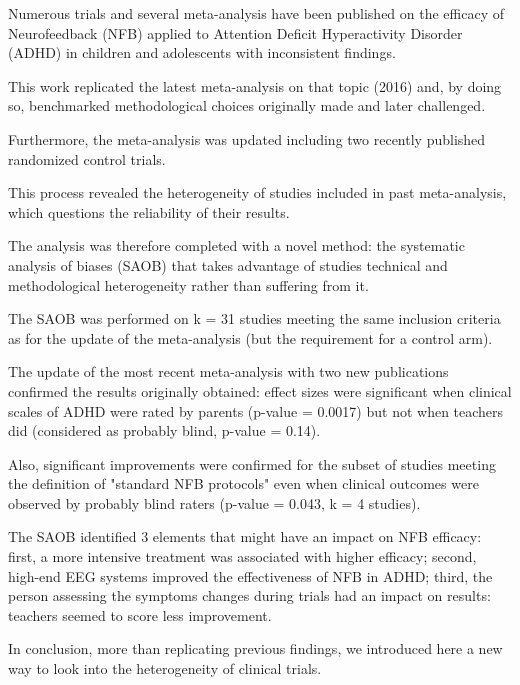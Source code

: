 

\noindent Numerous trials and several meta-analysis have been published on the efficacy of Neurofeedback (NFB) applied
to Attention Deficit Hyperactivity Disorder (ADHD) in children and adolescents with inconsistent findings.

This work replicated the latest meta-analysis on that topic (2016) and, by doing so, benchmarked methodological choices
originally made and later challenged.

Furthermore, the meta-analysis was updated including two recently published randomized control trials.

This process revealed the heterogeneity of studies included in past meta-analysis, which questions the reliability of
their results.

The analysis was therefore completed with a novel method: the systematic analysis of biases (SAOB) that takes advantage
of studies technical and methodological heterogeneity rather than suffering from it.

The SAOB was performed on k = 31 studies meeting the same inclusion criteria as for the update of the meta-analysis (but the requirement for a control arm).

The update of the most recent meta-analysis with two new publications confirmed the results originally obtained: effect
sizes were significant when clinical scales of ADHD were rated by parents (p-value = 0.0017) but not when teachers did
(considered as probably blind, p-value = 0.14).

Also, significant improvements were confirmed for the subset of studies meeting the definition of "standard NFB
protocols" even when clinical outcomes were observed by probably blind raters (p-value = 0.043, k = 4 studies).

The SAOB identified 3 elements that might have an impact on NFB efficacy: first, a more intensive treatment was
associated with higher efficacy; second, high-end EEG systems improved the effectiveness of NFB in ADHD; third, the
person assessing the symptoms changes during trials had an impact on results: teachers seemed to score less improvement.

In conclusion, more than replicating previous findings, we introduced here a new way to look into the heterogeneity of
clinical trials.  

